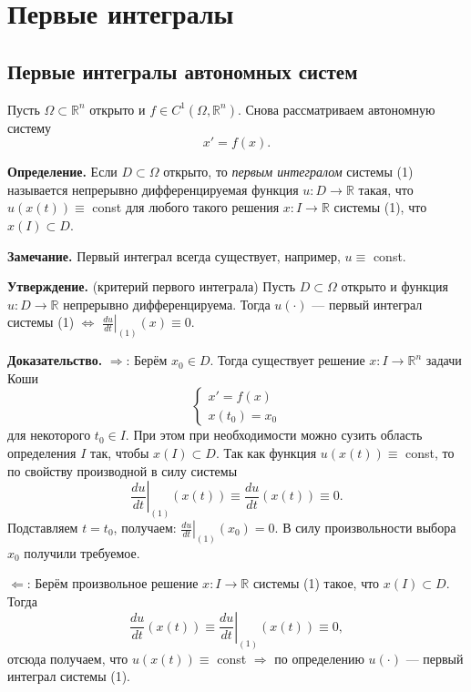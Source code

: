 \setcounter{equation}{0}
\section{Первые интегралы}
\subsection{Первые интегралы автономных систем}
Пусть $\Omega \subset \mathbb R^{n}$ открыто и $f \in C^1(\Omega, \mathbb R^n)$. Снова рассматриваем автономную систему
\begin{equation}
    x' = f(x).
\end{equation}

\textbf{Определение.} Если $D \subset \Omega$ открыто, то \textit{первым интегралом} системы (1) называется непрерывно дифференцируемая функция $u\colon D \to \mathbb R$ такая, что $u(x(t)) \equiv$ const для любого такого решения $x\colon I \to \mathbb{R}$ системы (1), что $x(I) \subset D$.

\textbf{Замечание.} Первый интеграл всегда существует, например, $u \equiv$ const.

\textbf{Утверждение.} (критерий первого интеграла) Пусть $D \subset \Omega$ открыто и функция $u\colon D \to \mathbb R$ непрерывно дифференцируема. Тогда $u(\cdot)$ --- первый интеграл системы (1) $\Leftrightarrow$ $\left.\frac{du}{dt}\right|_{(1)}(x) \equiv 0$.

\textbf{Доказательство.} $\Rightarrow$: Берём $x_0 \in D$. Тогда существует решение $x\colon I \to \mathbb{R}^n$ задачи Коши
\[
    \begin{cases}
        x' = f(x) \\
        x(t_0) = x_0
    \end{cases}
\]
для некоторого $t_0 \in I$. При этом при необходимости можно сузить область определения $I$ так, чтобы $x(I) \subset D$.
Так как функция $u(x(t)) \equiv$ const, то по свойству производной в силу системы
\[
    \left.\frac{du}{dt}\right|_{(1)}(x(t)) \equiv \frac{du}{dt}(x(t)) \equiv 0.
\]
Подставляем $t = t_0$, получаем: $\left.\frac{du}{dt}\right|_{(1)}(x_0) = 0$. В силу произвольности выбора $x_0$ получили требуемое.

$\Leftarrow$: Берём произвольное решение $x\colon I \to \mathbb{R}$ системы (1) такое, что $x(I) \subset D$. Тогда
\[
\frac{du}{dt}(x(t)) \equiv \left.\frac{du}{dt}\right|_{(1)}(x(t)) \equiv 0,
\]
отсюда получаем, что $u(x(t)) \equiv$ const $\Rightarrow$ по определению $u(\cdot)$ --- первый интеграл системы (1).

